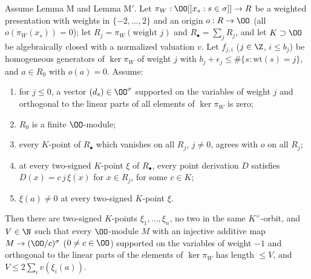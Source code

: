 \begin{proposition}\label{pf:eis:coord}
Assume Lemma M and Lemma M$'$. Let $\pi_W:\OO[[x_s:s\in\sigma]]\to R$ be a weighted presentation with weights in $\{-2,\dots,2\}$ and an origin
$o:R\to\OO$ (all $o(\pi_W(x_s))=0$); let $R_j=\pi_W(\text{weight }j)$ and $R_\bullet=\sum_jR_j$, and let $K\supset\OO$ be algebraically closed with a
normalized valuation $v$. Let $f_{j,i}$ ($j\in\Z$, $i\le b_j$) be homogeneous generators of $\ker\pi_W$ of weight $j$ with
$b_j+\epsilon_j\le\#\{s:\mathrm{wt}(s)=j\}$, and $a\in R_0$ with $o(a)=0$. Assume:
\begin{enumerate}[label=(m\arabic*)]
\item for $j\le0$, a vector $(d_s)\in\OO^\sigma$ supported on the variables of weight $j$ and orthogonal to the linear parts of all elements of
  $\ker\pi_W$ is zero;
\item $R_0$ is a finite $\OO$-module;
\item every $K$-point of $R_\bullet$ which vanishes on all $R_j$, $j\ne0$, agrees with $o$ on all $R_j$;
\item at every two-signed $K$-point $\xi$ of $R_\bullet$, every point derivation $D$ satisfies $D(x)=c\,j\,\xi(x)$ for $x\in R_j$, for some $c\in K$;
\item $\xi(a)\ne0$ at every two-signed $K$-point $\xi$.
\end{enumerate}
Then there are two-signed $K$-points $\xi_1,\dots,\xi_n$, no two in the same $K^\times$-orbit, and $V\in\N$ such that every $\OO$-module $M$
with an injective additive map $M\to(\OO/c)^\sigma$ ($0\ne c\in\OO$) supported on the variables of weight $-1$ and orthogonal to the linear
parts of the elements of $\ker\pi_W$ has length $\le V$, and $V\le2\sum_iv(\xi_i(a))$.
\end{proposition}

